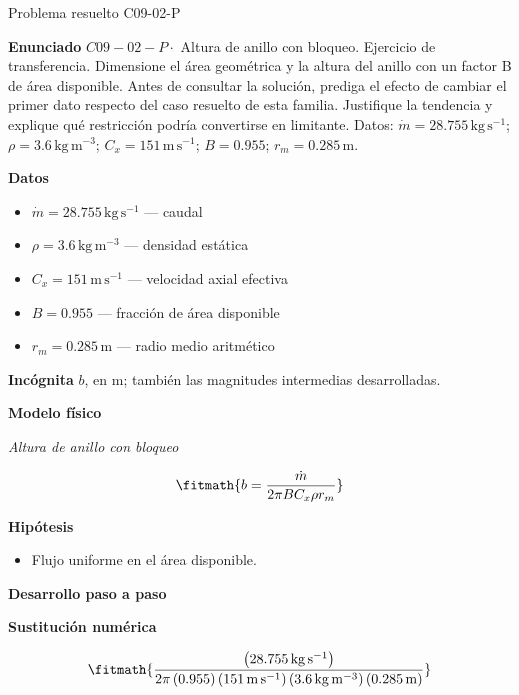 \documentclass[10pt,openany]{book}
\begin{document}
\begin{studiumworked}{Problema resuelto C09-02-P}


\noindent\textbf{Enunciado}
\(C09-02-P \cdot\) Altura de anillo con bloqueo. Ejercicio de transferencia. Dimensione el área geométrica y la altura del anillo con un factor B de área disponible. Antes de consultar la solución, prediga el efecto de cambiar el primer dato respecto del caso resuelto de esta familia. Justifique la tendencia y explique qué restricción podría convertirse en limitante. Datos: \(\dot m=28.755\, \mathrm{kg}\,\mathrm{s}^{-1}\); \(\rho=3.6\, \mathrm{kg}\,\mathrm{m}^{-3}\); \(C_x=151\, \mathrm{m}\,\mathrm{s}^{-1}\); \(B=0.955\); \(r_m=0.285\, \mathrm{m}\).

\noindent\textbf{Datos}
\begin{itemize}
\item $\dot m = 28.755\,\mathrm{kg}\,\mathrm{s}^{-1}$ — caudal
\item $\rho = 3.6\,\mathrm{kg}\,\mathrm{m}^{-3}$ — densidad estática
\item $C_x = 151\,\mathrm{m}\,\mathrm{s}^{-1}$ — velocidad axial efectiva
\item $B = 0.955$ — fracción de área disponible
\item $r_m = 0.285\,\mathrm{m}$ — radio medio aritmético
\end{itemize}

\noindent\textbf{Incógnita}
$b$, en $\mathrm{m}$; también las magnitudes intermedias desarrolladas.

\noindent\textbf{Modelo físico}

\noindent\textit{Altura de anillo con bloqueo}

\[
\fitmath{b=\frac{\dot m}{2 \pi B C_x \rho r_m}}
\]

\noindent\textbf{Hipótesis}
\begin{itemize}
\item Flujo uniforme en el área disponible.
\end{itemize}

\noindent\textbf{Desarrollo paso a paso}



\noindent\textbf{Sustitución numérica}

\[
\fitmath{\frac{\left(28.755\,\mathrm{kg}\,\mathrm{s}^{-1}\right)}{2 \pi \left(0.955\right) \left(151\,\mathrm{m}\,\mathrm{s}^{-1}\right) \left(3.6\,\mathrm{kg}\,\mathrm{m}^{-3}\right) \left(0.285\,\mathrm{m}\right)}}
\]


\end{studiumworked}
\end{document}
